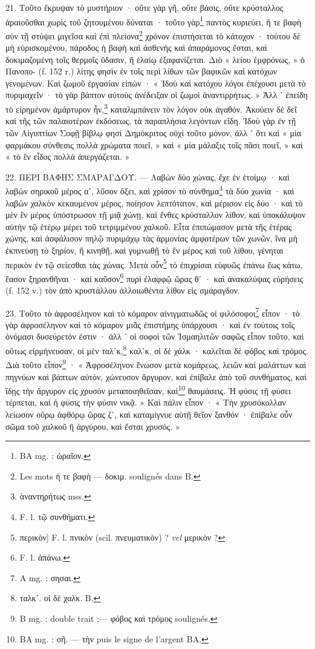 \documentclass[a4paper, 11pt, oneside, polutonikogreek, french]{article}
\begin{document}
21. Τοῦτο ἔκρυψαν τὸ μυστήριον · οὔτε γὰρ γῆ, οὔτε βάσις, οὔτε κρύσταλλος ἀραιοῦσθαι χωρὶς τοῦ ζητουμένου δύναται · τοῦτο γὰρ\footnote{BA mg. : ὡραῖον.} παντὸς κυριεύει, ἥ τε βαφὴ σὺν τῇ στύψει μιγεῖσα καὶ ἐπὶ πλείονα\footnote{Les mots ἡ τε βαφὴ --- δοκιμ. soulignés dans B.} χρόνον ἐπιστήσεται τὸ κάτοχον · τούτου δὲ μὴ εὑρισκομένου, πάροδος ἡ βαφὴ καὶ ἀσθενὴς καὶ ἀπαράμονος ἔσται, καὶ δοκιμαζομένη τοῖς θερμοῖς ὕδασιν, ἢ ἐλαίῳ ἐξαφανίζεται. Διὸ « λείου ἐμφρόνως, » ὁ Πανοπο- (f. 152 r.) λίτης φησὶν ἐν τοῖς περὶ λίθων τῶν βαφικῶν καὶ κατόχων γενομένων. Καὶ ζωμοῦ ἐργασίαν εἰπών · « Ἰδοὺ καὶ κατόχου λόγοι ἐπέχουσι μετὰ τὸ πυριμαχεῖν · τὸ γὰρ βάπτον αὐτοὺς ἀνέδειξαν οἱ ζωμοὶ ἀναντιρρήτως. » Ἀλλ ᾽ ἐπείδη τὸ εἰρημένον ἀμάρτυρον ἦν,\footnote{ὰναντηρήτως mss.} καταλιμπάνειν τὸν λόγον οὐκ ἀγαθόν. Ἀκούειν δὲ δεῖ καὶ τῆς τῶν παλαιοτέρων ἐκδόσεως, τὰ παραπλήσια λεγόντων εἴδη. Ἰδοὺ γὰρ ἐν τῇ τῶν Αἰγυπτίων Σοφῇ βίβλῳ φησὶ Δημόκριτος οὐχὶ τοῦτο μόνον, ἀλλ ᾽ ὅτι καὶ « μία φαρμάκου σύνθεσις πολλὰ χρώματα ποιεῖ, » καὶ « μία μάλαξις τοῖς πᾶσι ποιεῖ, » καὶ « τὸ ἓν εἶδος πολλὰ ἀπεργάζεται. »

22. ΠΕΡΙ ΒΑΦΗΣ ΣΜΑΡΑΓΔΟΥ. --- Λαβὼν δύο χώνας, ἔχε ἐν ἑτοίμῳ · καὶ λαβὼν σηρικοῦ μέρος αʹ, λῦσον ὄξει, καὶ χρίσον τὸ σύνθημα\footnote{F. l. τῷ συνθήματι.} τὰ δύο χωνία · καὶ λαβὼν χαλκὸν κεκαυμένον μέρος, ποίησον λεπτότατον, καὶ μέρισον εἰς δύο · καὶ τὸ μὲν ἓν μέρος ὑπόστρωσον τῇ μιᾷ χώνῃ, καὶ ἔνθες κρύσταλλον λίθον, καὶ ὑποκάλυψον αὐτὴν τῷ ἑτέρῳ μέρει τοῦ τετριμμένου χαλκοῦ. Εἶτα ἐπιπώμασον μετὰ τῆς ἑτέρας χώνης, καὶ ἀσφάλισον πηλῷ πυριμάχῳ τὰς ἁρμονίας ἀμφοτέρων τῶν χωνῶν, ἵνα μὴ ἐκπνεύσῃ τὸ ξηρίον, ἢ κινηθῇ, καὶ γυμνωθῇ τὸ ἓν μέρος καὶ τοῦ λίθου, γένηται περικὸν ἐν τῷ σείεσθαι τὰς χώνας. Μετὰ οὖν\footnote{περικὸν] F. l. πνικὸν (scil. πνευματικὸν) ? \emph{vel} μερικὸν ?} τὸ ἐπιχρίσαι εὐφυῶς ἐπάνω ἕως κάτω, ἔασον ξηρανθῆναι · καὶ καῦσον\footnote{F. l. ἀπάνω.} πυρὶ ἐλαφφῷ ὥρας θʹ · καὶ ἀνακαλύψας εὑρήσεις (f. 152 v.) τὸν ἀπὸ κρυστάλλου ἀλλοιωθέντα λίθον εἰς σμάραγδον.

23. Τοῦτο τὸ ἀφροσέληνον καὶ τὸ κόμαρον αἰνιγματωδῶς οἱ φιλόσοφοι\footnote{A mg. : σησαι.} εἶπον · τὸ γὰρ ἀφροσέληνον καὶ τὸ κόμαρον μιᾶς ἐπιστήμης ὑπάρχουσι · καὶ ἐν τούτοις τοῖς ὀνόμασι δυσεύρετόν ἐστιν · ἀλλ ᾽ οἱ σοφοὶ τῶν Ἰσμαηλιτῶν σαφῶς εἶπον τοῦτο, καὶ οὕτως εἱρμήνευσαν, οἱ μὲν ταλʹκ,\footnote{ταλκʹ. οἱ δὲ χαλκ. B.} καλʹκ, οἱ δὲ χάλκ · καλεῖται δὲ φόβος καὶ τρόμος. Διὰ τοῦτο εἶπον\footnote{B mg. : double trait ;--- φόβος καὶ τρόμος soulignés.} · « Ἀφροσέληνον ἕνωσον μετὰ κομάρεως, λειῶν καὶ μαλάττων καὶ πηγνύων καὶ βάπτων αὐτὸν, χώνευσον ἄργυρον, καὶ ἐπίβαλε ἀπὸ τοῦ συνθήματος, καὶ ἴδῃς τὴν ἄργυρον εἰς χρυσὸν μεταποιηθεῖσαν, καὶ\footnote{BA mg. : σῆ. --- τὴν puis le signe de l'argent BA.} θαυμάσεις. Ἡ φύσις τῇ φύσει τέρπεται, καὶ ἡ φύσις τὴν φύσιν νικᾷ. » Καὶ πάλιν εἶπον · « Τὴν χρυσόκολλαν λείωσον οὔρῳ ἀφθόρῳ ὥρας ζʹ, καὶ καταμίγνυε αὐτῇ θεῖον ξανθόν · ἐπίβαλε οὖν σῶμα τοῦ χαλκοῦ ἢ ἀργύρου, καὶ ἔσται χρυσός. »
\end{document}
